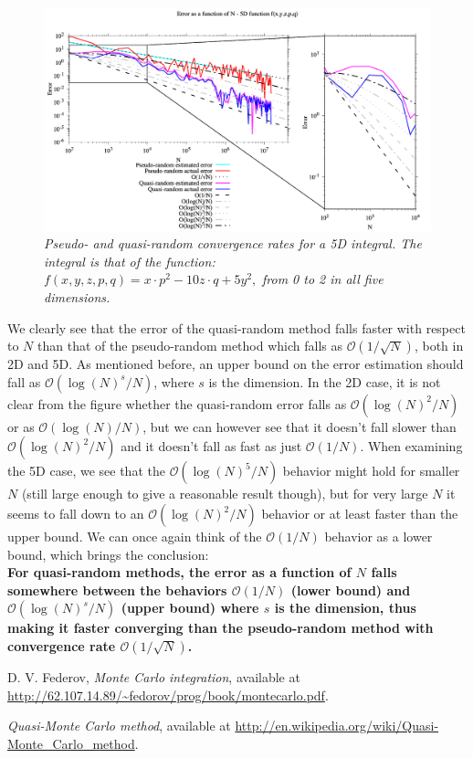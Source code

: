 \documentclass{article}
\begin{document}
\begin{figure}[t]
    \centering
    \includegraphics[width=\textwidth]{Convergence5D.png}
    \caption{\textsl{Pseudo- and quasi-random convergence rates for a 5D integral. The integral is that 
of the function:} $f(x,y,z,p,q)=x\cdot p^2 -10 z\cdot q + 5y^2,$ \textsl{from 0 to 2 in all five dimensions.}}
    \label{fig:5D}
\end{figure}



We clearly see that the error of the quasi-random method falls faster with respect
to $N$ than that of the pseudo-random method which falls as $\mathcal{O}(1/\sqrt{N})$, both in 2D and
5D. As mentioned before, an upper bound on
the error estimation should fall as $\mathcal{O}(\log(N)^s/N)$, where $s$ is the dimension. In the
2D case, it is not clear from the figure whether the quasi-random error falls as
$\mathcal{O}(\log(N)^2/N)$ or as $\mathcal{O}(\log(N)/N)$, but we can however see that it doesn't fall slower
than $\mathcal{O}(\log(N)^2/N)$ and it doesn't fall as fast as just $\mathcal{O}(1/N)$.
When examining the 5D case, we see that the $\mathcal{O}(\log(N)^5/N)$ behavior might hold for
smaller $N$ (still large enough to give a reasonable result though), but for very
large $N$ it seems to fall down to an $\mathcal{O}(\log(N)^2/N)$ behavior or at least faster than
the upper bound. We can once again think of the $\mathcal{O}(1/N)$ behavior as a lower bound,
which brings the conclusion:
\\

\textbf{For quasi-random methods, the error as a function of $N$ falls somewhere between the
behaviors $\mathcal{O}(1/N)$ (lower bound) and $\mathcal{O}(\log(N)^s/N)$ (upper bound) where $s$ is the 
dimension, thus making it faster converging than the pseudo-random method with
convergence rate $\mathcal{O}(1/\sqrt{N})$.}


\newpage
\begin{thebibliography}{99}

 D. V. Federov, \emph{Monte Carlo integration},  available at
\url{http://62.107.14.89/~fedorov/prog/book/montecarlo.pdf}.

 \emph{Quasi-Monte Carlo method},  available at
\url{http://en.wikipedia.org/wiki/Quasi-Monte_Carlo_method}.

\end{thebibliography}
\end{document}
